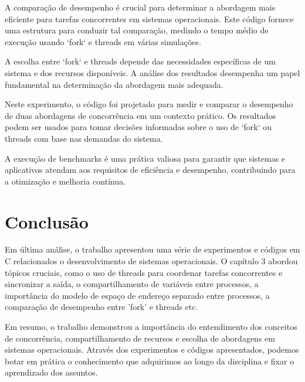 \documentclass[
	12pt,				%
	openright,			%
	oneside,			%
	a4paper,			%
	chapter=TITLE,		%
	english,			%
	french,				%
	spanish,			%
	brazil				%
	]{abntex2}
\theoremstyle{definition}
\begin{document}
A comparação de desempenho é crucial para determinar a abordagem mais eficiente para tarefas concorrentes em sistemas operacionais. Este código fornece uma estrutura para conduzir tal comparação, medindo o tempo médio de execução usando `fork` e threads em várias simulações.

A escolha entre `fork` e threads depende das necessidades específicas de um sistema e dos recursos disponíveis. A análise dos resultados desempenha um papel fundamental na determinação da abordagem mais adequada.


Neste experimento, o código foi projetado para medir e comparar o desempenho de duas abordagens de concorrência em um contexto prático. Os resultados podem ser usados para tomar decisões informadas sobre o uso de `fork` ou threads com base nas demandas do sistema.

A execução de benchmarks é uma prática valiosa para garantir que sistemas e aplicativos atendam aos requisitos de eficiência e desempenho, contribuindo para a otimização e melhoria contínua.


\chapter{Conclusão}
\label{conclusao}
Em última análise, o trabalho apresentou uma série de experimentos e códigos em C relacionados 
o desenvolvimento de sistemas operacionais. O capítulo 3 abordou tópicos cruciais, como o uso
de threads para coordenar tarefas concorrentes e sincronizar a saída, o compartilhamento de 
variáveis entre processos, a importância do modelo de espaço de endereço separado entre processos,
a comparação de desempenho entre 'fork' e threads etc.

Em resumo, o trabalho demonstrou a importância do entendimento dos conceitos de concorrência, 
compartilhamento de recursos e escolha de abordagens em sistemas operacionais. Através dos 
experimentos e códigos apresentados, podemos botar em prática o conhecimento que adquirimos 
ao longo da disciplina e fixar o aprendizado dos assuntos.




\postextual



\cite{tanenbaum2010sistemas}
\end{document}

